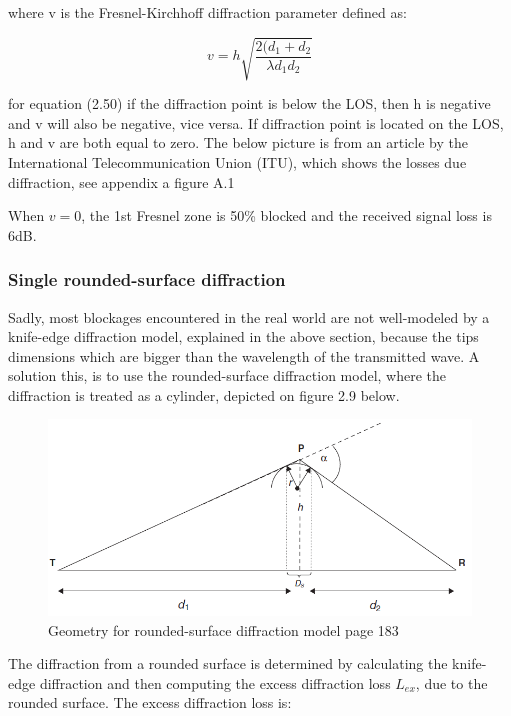 where v is the Fresnel-Kirchhoff diffraction parameter defined as:

\begin{equation}
    v = h \sqrt{\frac{2(d_1+d_2}{\lambda d_1d_2}}
\end{equation}

for equation (2.50) if the diffraction point is below the LOS, then h is negative and v will also be negative, vice versa. If diffraction point is located on the LOS, h and v are both equal to zero. The below picture is from an article by the International Telecommunication Union (ITU)\cite{ITU}, which shows the losses due diffraction, see appendix a figure A.1

When $v=0$, the 1st Fresnel zone is 50\% blocked and the received signal loss is 6dB. 

\subsubsection{Single rounded-surface diffraction}
Sadly, most blockages encountered in the real world are not well-modeled by a knife-edge diffraction model, explained in the above section, because the tips dimensions which are bigger than the wavelength of the transmitted wave. A solution this, is to use the rounded-surface diffraction model, where the diffraction is treated as a cylinder, depicted on figure 2.9 below. 

\begin{figure}[h]
\hspace{0.5cm}
\includegraphics[scale=0.6]{figures/RoundedDiffraction.PNG}
\caption{Geometry for rounded-surface diffraction model\cite{RFpropagation} page 183}
\end{figure}

The diffraction from a rounded surface is determined by calculating the knife-edge diffraction and then computing the excess diffraction loss $L_{ex}$, due to the rounded surface. The excess diffraction loss is:

